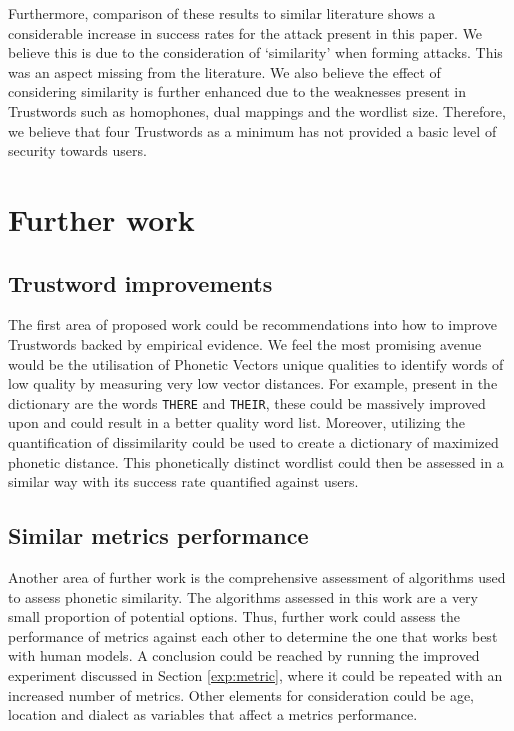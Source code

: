 Furthermore, comparison of these results to similar literature shows a considerable increase in success rates for the attack present in this paper. We believe this is due to the consideration of `similarity' when forming attacks. This was an aspect missing from the literature.
We also believe the effect of considering similarity is further enhanced due to the  weaknesses present in Trustwords such as homophones, dual mappings and the wordlist size. Therefore, we believe that four Trustwords as a minimum has not provided a basic level of security towards users.

\section{Further work}

\subsection*{Trustword improvements}
The first area of proposed work could be recommendations into how to improve Trustwords backed by empirical evidence. We feel the most promising avenue would be the utilisation of Phonetic Vectors unique qualities to identify words of low quality by measuring very low vector distances. For example, present in the dictionary are the words \verb|THERE| and \verb|THEIR|, these could be massively improved upon and could result in a better quality word list. Moreover, utilizing the quantification of dissimilarity could be used to create a dictionary of maximized phonetic distance. This phonetically distinct wordlist could then be assessed in a similar way with its success rate quantified against users.

\subsection*{Similar metrics performance}
Another area of further work is the comprehensive assessment of algorithms used to assess phonetic similarity. The algorithms assessed in this work are a very small proportion of potential options. Thus, further work could assess the performance of metrics against each other to determine the one that works best with human models. A conclusion could be reached by running the improved experiment discussed in Section \ref{exp:metric}, where it could be repeated with an increased number of metrics. Other elements for consideration could be age, location and dialect as variables that affect a metrics performance. 

